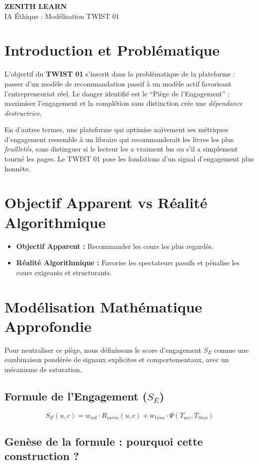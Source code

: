 \documentclass[11pt,a4paper]{article}
\newcommand{\makebrandtitle}{
    \begin{tcolorbox}[enhanced, colback=BrandDark, colframe=BrandPrimary, arc=10pt, boxrule=2pt, halign=center]
        \vspace{0.3cm}
        {\Huge \bfseries \color{white} ZENITH LEARN} \\
        \vspace{0.2cm}
        {\Large \color{BrandPrimary} IA Éthique : Modélisation TWIST 01} \\
        \vspace{0.3cm}
    \end{tcolorbox}
    \vspace{0.5cm}
}
\begin{document}
\makebrandtitle

\section{Introduction et Problématique}
L'objectif du \textbf{TWIST 01} s'inscrit dans la problématique de la plateforme : passer d'un modèle de recommandation passif à un modèle actif favorisant l'entrepreneuriat réel. Le danger identifié est le ``Piège de l'Engagement'' : maximiser l'engagement et la complétion sans distinction crée une \textit{dépendance destructrice}.

En d'autres termes, une plateforme qui optimise naïvement ses métriques d'engagement ressemble à un libraire qui recommanderait les livres les plus \textit{feuilletés}, sans distinguer si le lecteur les a vraiment lus ou s'il a simplement tourné les pages. Le TWIST 01 pose les fondations d'un signal d'engagement plus honnête.

\section{Objectif Apparent vs Réalité Algorithmique}
\begin{itemize}
    \item \textbf{Objectif Apparent :} Recommander les cours les plus regardés.
    \item \textbf{Réalité Algorithmique :} Favorise les spectateurs passifs et pénalise les cours exigeants et structurants.
\end{itemize}

\section{Modélisation Mathématique Approfondie}
Pour neutraliser ce piège, nous définissons le score d'engagement $S_E$ comme une combinaison pondérée de signaux explicites et comportementaux, avec un mécanisme de saturation.

\subsection{Formule de l'Engagement ($S_E$)}
\begin{equation}
S_{E}(u, c) = w_{rat} \cdot R_{norm}(u,c) + w_{time} \cdot \Psi(T_{acc}, T_{theo})
\end{equation}

\subsection{Genèse de la formule : pourquoi cette construction ?}
\end{document}
